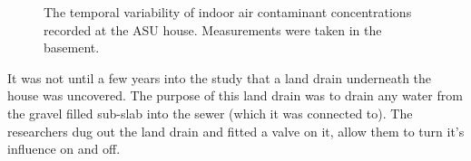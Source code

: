 \begin{figure}[htb!]
  \caption{The temporal variability of indoor air contaminant concentrations recorded at the ASU house. Measurements were taken in the basement.}
  \label{fig:asu_indoor_concentrations}
\end{figure}

It was not until a few years into the study that a land drain underneath the house was uncovered.
The purpose of this land drain was to drain any water from the gravel filled sub-slab into the sewer (which it was connected to).
The researchers dug out the land drain and fitted a valve on it, allow them to turn it's influence on and off.
